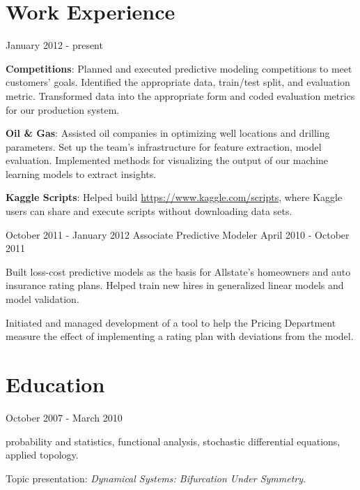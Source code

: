 \documentclass[letterpaper]{resume}
\author{David J. Chudzicki}
\begin{document}
\maketitle

\section{Work Experience}

{January 2012 - present}            


\begin{compactitem}
\item \textbf{Competitions}: Planned and executed predictive modeling competitions to meet customers' goals. Identified the appropriate data, train/test split, and evaluation metric. Transformed data into the appropriate form and coded evaluation metrics for our production system.
\item \textbf{Oil \& Gas}: Assisted oil companies in optimizing well locations and drilling parameters. Set up the team's infrastructure for feature extraction, model evaluation. Implemented methods for visualizing the output of our machine learning models to extract insights.
\item \textbf{Kaggle Scripts}: Helped build \href{https://www.kaggle.com/scripts}{https://www.kaggle.com/scripts}, where Kaggle users can share and execute scripts without downloading data sets.
\end{compactitem}


{October 2011 - January 2012}
{Associate Predictive Modeler}
{April 2010 - October 2011}


\begin{compactitem}
\item Built loss-cost predictive models as the basis for
Allstate's homeowners and auto insurance rating
plans. Helped train new hires in generalized linear models
and model validation. 
\item Initiated and managed
development of a tool to help the Pricing Department measure
the effect of implementing a rating plan with deviations from the model.
\end{compactitem}

\section{Education}

{October 2007 - March 2010}
{}
{}
\begin{compactitem}
\item probability and statistics, functional analysis, stochastic differential equations, applied topology.
\item Topic presentation: \textit{Dynamical Systems: Bifurcation Under Symmetry}.      
\end{compactitem}
\end{document}
